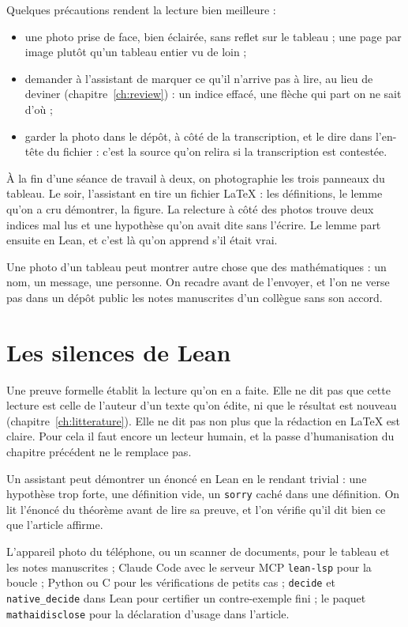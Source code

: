 Quelques précautions rendent la lecture bien meilleure :
\begin{itemize}
  \item une photo prise de face, bien éclairée, sans reflet sur le tableau ; une page par
        image plutôt qu'un tableau entier vu de loin ;
  \item demander à l'assistant de marquer ce qu'il n'arrive pas à lire, au lieu de deviner
        (chapitre~\ref{ch:review}) : un indice effacé, une flèche qui part on ne sait d'où ;
  \item garder la photo dans le dépôt, à côté de la transcription, et le dire dans
        l'en-tête du fichier : c'est la source qu'on relira si la transcription est
        contestée.
\end{itemize}

\begin{exemple}
À la fin d'une séance de travail à deux, on photographie les trois panneaux du tableau.
Le soir, l'assistant en tire un fichier LaTeX : les définitions, le lemme qu'on a cru
démontrer, la figure. La relecture à côté des photos trouve deux indices mal lus et une
hypothèse qu'on avait dite sans l'écrire. Le lemme part ensuite en Lean, et c'est là
qu'on apprend s'il était vrai.
\end{exemple}

\begin{warningblock}
Une photo d'un tableau peut montrer autre chose que des mathématiques : un nom, un
message, une personne. On recadre avant de l'envoyer, et l'on ne verse pas dans un dépôt
public les notes manuscrites d'un collègue sans son accord.
\end{warningblock}

\section{Les silences de Lean}

Une preuve formelle établit la lecture qu'on en a faite. Elle ne dit pas que cette lecture
est celle de l'auteur d'un texte qu'on édite, ni que le résultat est nouveau
(chapitre~\ref{ch:litterature}). Elle ne dit pas non plus que la rédaction en LaTeX est
claire. Pour cela il faut encore un lecteur humain, et la passe d'humanisation du
chapitre précédent ne le remplace pas.

\begin{warningblock}
Un assistant peut \og démontrer \fg{} un énoncé en Lean en le rendant trivial : une
hypothèse trop forte, une définition vide, un \texttt{sorry} caché dans une définition. On
lit l'énoncé du théorème avant de lire sa preuve, et l'on vérifie qu'il dit bien ce que
l'article affirme.
\end{warningblock}

\begin{outils}
L'appareil photo du téléphone, ou un scanner de documents, pour le tableau et les notes manuscrites ;
Claude Code avec le serveur MCP \texttt{lean-lsp} pour la boucle ; Python ou C pour les
vérifications de petits cas ; \texttt{decide} et \texttt{native\_decide} dans Lean pour
certifier un contre-exemple fini ; le paquet \texttt{mathaidisclose} pour la déclaration
d'usage dans l'article.
\end{outils}

